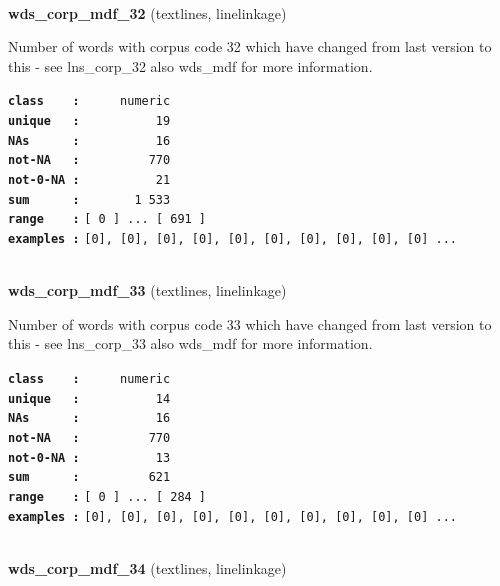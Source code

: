 \documentclass[]{article}
\begin{document}
~

\textbf{wds\_corp\_mdf\_32} (textlines, linelinkage)

Number of words with corpus code 32 which have changed from last version
to this - see lns\_corp\_32 also wds\_mdf for more information.

\textbf{\texttt{class\ \ \ \ :}} \texttt{~~~~~numeric}\\
\textbf{\texttt{unique\ \ \ :}} \texttt{~~~~~~~~~~19}\\
\textbf{\texttt{NAs\ \ \ \ \ \ :}} \texttt{~~~~~~~~~~16}\\
\textbf{\texttt{not-NA\ \ \ :}} \texttt{~~~~~~~~~770}\\
\textbf{\texttt{not-0-NA\ :}} \texttt{~~~~~~~~~~21}\\
\textbf{\texttt{sum\ \ \ \ \ \ :}} \texttt{~~~~~~~1~533}\\
\textbf{\texttt{range\ \ \ \ :}}
\texttt{{[}\ 0\ {]}\ ...\ {[}\ 691\ {]}}\\
\textbf{\texttt{examples\ :}}
\texttt{{[}0{]},\ {[}0{]},\ {[}0{]},\ {[}0{]},\ {[}0{]},\ {[}0{]},\ {[}0{]},\ {[}0{]},\ {[}0{]},\ {[}0{]}\ ...}\\

~

\textbf{wds\_corp\_mdf\_33} (textlines, linelinkage)

Number of words with corpus code 33 which have changed from last version
to this - see lns\_corp\_33 also wds\_mdf for more information.

\textbf{\texttt{class\ \ \ \ :}} \texttt{~~~~~numeric}\\
\textbf{\texttt{unique\ \ \ :}} \texttt{~~~~~~~~~~14}\\
\textbf{\texttt{NAs\ \ \ \ \ \ :}} \texttt{~~~~~~~~~~16}\\
\textbf{\texttt{not-NA\ \ \ :}} \texttt{~~~~~~~~~770}\\
\textbf{\texttt{not-0-NA\ :}} \texttt{~~~~~~~~~~13}\\
\textbf{\texttt{sum\ \ \ \ \ \ :}} \texttt{~~~~~~~~~621}\\
\textbf{\texttt{range\ \ \ \ :}}
\texttt{{[}\ 0\ {]}\ ...\ {[}\ 284\ {]}}\\
\textbf{\texttt{examples\ :}}
\texttt{{[}0{]},\ {[}0{]},\ {[}0{]},\ {[}0{]},\ {[}0{]},\ {[}0{]},\ {[}0{]},\ {[}0{]},\ {[}0{]},\ {[}0{]}\ ...}\\

~

\textbf{wds\_corp\_mdf\_34} (textlines, linelinkage)
\end{document}
